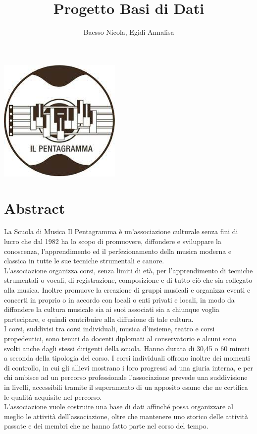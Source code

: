 \documentclass[11pt]{article}
\title{Progetto Basi di Dati}
\author{Baesso Nicola, Egidi Annalisa}
\begin{document}

\maketitle %
\begin{center} %
	\includegraphics{logo.jpeg}	
\end{center}
\newpage %
\tableofcontents %
\newpage
\section{Abstract}
La Scuola di Musica Il Pentagramma è un’associazione culturale senza fini di lucro che dal 1982 ha lo scopo di promuovere, diffondere e sviluppare la conoscenza, l’apprendimento ed il perfezionamento della musica moderna e classica in tutte le sue tecniche strumentali e canore.\\
L'associazione organizza corsi, senza limiti di età, per l'apprendimento di tecniche strumentali o vocali, di registrazione, composizione e di tutto ciò che sia collegato alla musica. Inoltre promuove la creazione di gruppi musicali e organizza eventi e concerti in proprio o in accordo con locali o enti privati e locali, in modo da diffondere la cultura musicale sia ai suoi associati sia a chiunque voglia partecipare, e quindi contribuire alla diffusione di tale cultura.\\
I corsi, suddivisi tra corsi individuali, musica d'insieme, teatro e corsi propedeutici, sono tenuti da docenti diplomati al conservatorio e alcuni sono svolti anche dagli stessi dirigenti della scuola. Hanno durata di 30,45 o 60 minuti a seconda della tipologia del corso. I corsi individuali offrono inoltre dei momenti di controllo, in cui gli allievi mostrano i loro progressi ad una giuria interna, e per chi ambisce ad un percorso professionale l'associazione prevede una suddivisione in livelli, accessibili tramite il superamento di un apposito esame che ne certifica le qualità acquisite nel percorso.\\
L'associazione vuole costruire una base di dati affinché possa organizzare al meglio le attività dell'associazione, oltre che mantenere uno storico delle attività passate e dei membri che ne hanno fatto parte nel corso del tempo.
\end{document}
